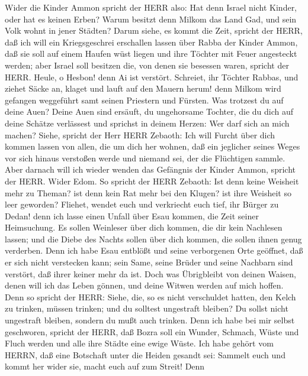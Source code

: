  Wider die Kinder Ammon spricht der HERR also: Hat denn
Israel nicht Kinder, oder hat es keinen Erben? Warum besitzt denn Milkom
das Land Gad, und sein Volk wohnt in jener Städten?  Darum
siehe, es kommt die Zeit, spricht der HERR, daß ich will ein
Kriegsgeschrei erschallen lassen über Rabba der Kinder Ammon, daß sie
soll auf einem Haufen wüst liegen und ihre Töchter mit Feuer angesteckt
werden; aber Israel soll besitzen die, von denen sie besessen waren,
spricht der HERR.  Heule, o Hesbon! denn Ai ist verstört.
Schreiet, ihr Töchter Rabbas, und ziehet Säcke an, klaget und lauft auf
den Mauern herum! denn Milkom wird gefangen weggeführt samt seinen
Priestern und Fürsten.  Was trotzest du auf deine Auen?
Deine Auen sind ersäuft, du ungehorsame Tochter, die du dich auf deine
Schätze verlässest und sprichst in deinem Herzen: Wer darf sich an mich
machen?  Siehe, spricht der Herr HERR Zebaoth: Ich will
Furcht über dich kommen lassen von allen, die um dich her wohnen, daß
ein jeglicher seines Weges vor sich hinaus verstoßen werde und niemand
sei, der die Flüchtigen sammle.  Aber darnach will ich
wieder wenden das Gefängnis der Kinder Ammon, spricht der HERR.
 Wider Edom. So spricht der HERR Zebaoth: Ist denn keine
Weisheit mehr zu Theman? ist denn kein Rat mehr bei den Klugen? ist ihre
Weisheit so leer geworden?  Fliehet, wendet euch und
verkriecht euch tief, ihr Bürger zu Dedan! denn ich lasse einen Unfall
über Esau kommen, die Zeit seiner Heimsuchung.  Es sollen
Weinleser über dich kommen, die dir kein Nachlesen lassen; und die Diebe
des Nachts sollen über dich kommen, die sollen ihnen genug verderben.
 Denn ich habe Esau entblößt und seine verborgenen Orte
geöffnet, daß er sich nicht verstecken kann; sein Same, seine Brüder und
seine Nachbarn sind verstört, daß ihrer keiner mehr da ist.
 Doch was Übrigbleibt von deinen Waisen, denen will ich das
Leben gönnen, und deine Witwen werden auf mich hoffen. 
Denn so spricht der HERR: Siehe, die, so es nicht verschuldet hatten,
den Kelch zu trinken, müssen trinken; und du solltest ungestraft
bleiben? Du sollst nicht ungestraft bleiben, sondern du mußt auch
trinken.  Denn ich habe bei mir selbst geschworen, spricht
der HERR, daß Bozra soll ein Wunder, Schmach, Wüste und Fluch werden und
alle ihre Städte eine ewige Wüste.  Ich habe gehört vom
HERRN, daß eine Botschaft unter die Heiden gesandt sei: Sammelt euch und
kommt her wider sie, macht euch auf zum Streit!  Denn
